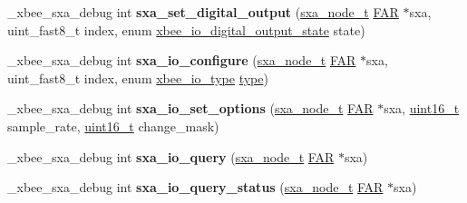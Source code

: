 \begin{DoxyCompactItemize}
\item 
\hypertarget{group___s_x_a_ga5479fd816024530e822d6191357d8d79}{\-\_\-xbee\-\_\-sxa\-\_\-debug int {\bfseries sxa\-\_\-set\-\_\-digital\-\_\-output} (\hyperlink{structsxa__node__t}{sxa\-\_\-node\-\_\-t} \hyperlink{group__hal_gaef060b3456fdcc093a7210a762d5f2ed}{F\-A\-R} $\ast$sxa, uint\-\_\-fast8\-\_\-t index, enum \hyperlink{group__xbee__io_gaf104a10d2bc34550b99de92fe3564cd2}{xbee\-\_\-io\-\_\-digital\-\_\-output\-\_\-state} state)}\label{group___s_x_a_ga5479fd816024530e822d6191357d8d79}

\item 
\hypertarget{group___s_x_a_gaeedb9e47f6ee8470ebae15440a9343f1}{\-\_\-xbee\-\_\-sxa\-\_\-debug int {\bfseries sxa\-\_\-io\-\_\-configure} (\hyperlink{structsxa__node__t}{sxa\-\_\-node\-\_\-t} \hyperlink{group__hal_gaef060b3456fdcc093a7210a762d5f2ed}{F\-A\-R} $\ast$sxa, uint\-\_\-fast8\-\_\-t index, enum \hyperlink{group__xbee__io_gac23a55c53310f865d9ed2381e331a438}{xbee\-\_\-io\-\_\-type} \hyperlink{group__zcl_ga1d127017fb298b889f4ba24752d08b8e}{type})}\label{group___s_x_a_gaeedb9e47f6ee8470ebae15440a9343f1}

\item 
\hypertarget{group___s_x_a_gab8bd3f38d1a7cb4497e1d037d9e3e7dc}{\-\_\-xbee\-\_\-sxa\-\_\-debug int {\bfseries sxa\-\_\-io\-\_\-set\-\_\-options} (\hyperlink{structsxa__node__t}{sxa\-\_\-node\-\_\-t} \hyperlink{group__hal_gaef060b3456fdcc093a7210a762d5f2ed}{F\-A\-R} $\ast$sxa, \hyperlink{group__hal_ga5a8b2dc9e45a9ee81a94ef304fb62505}{uint16\-\_\-t} sample\-\_\-rate, \hyperlink{group__hal_ga5a8b2dc9e45a9ee81a94ef304fb62505}{uint16\-\_\-t} change\-\_\-mask)}\label{group___s_x_a_gab8bd3f38d1a7cb4497e1d037d9e3e7dc}

\item 
\hypertarget{group___s_x_a_ga652e37d2a3e16d2723e68ad4488d8cce}{\-\_\-xbee\-\_\-sxa\-\_\-debug int {\bfseries sxa\-\_\-io\-\_\-query} (\hyperlink{structsxa__node__t}{sxa\-\_\-node\-\_\-t} \hyperlink{group__hal_gaef060b3456fdcc093a7210a762d5f2ed}{F\-A\-R} $\ast$sxa)}\label{group___s_x_a_ga652e37d2a3e16d2723e68ad4488d8cce}

\item 
\hypertarget{group___s_x_a_ga47f2a1443c29bcbd290292ec33574403}{\-\_\-xbee\-\_\-sxa\-\_\-debug int {\bfseries sxa\-\_\-io\-\_\-query\-\_\-status} (\hyperlink{structsxa__node__t}{sxa\-\_\-node\-\_\-t} \hyperlink{group__hal_gaef060b3456fdcc093a7210a762d5f2ed}{F\-A\-R} $\ast$sxa)}\label{group___s_x_a_ga47f2a1443c29bcbd290292ec33574403}


\end{DoxyCompactItemize}
